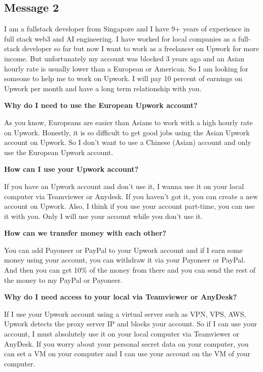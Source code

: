 \documentclass[11pt]{article}
\newcommand{\sender}[2]{%
  \medskip
  \noindent{\small\textbf{From:} #1 \hfill \textbf{Date:} #2}\par
  \smallskip
}
\begin{document}
\newpage
\subsection*{Message 2}

\sender{Kratos}{2026-03-17}

\begin{msgbox}
I am a fullstack developer from Singapore and I have 9+ years of experience in
full stack web3 and AI engineering. I have worked for local companies as a
full-stack developer so far but now I want to work as a freelancer on Upwork
for more income. But unfortunately my account was blocked 3 years ago and an
Asian hourly rate is usually lower than a European or American. So I am looking
for someone to help me to work on Upwork. I will pay 10 percent of earnings on
Upwork per month and have a long term relationship with you.

\smallskip\noindent\textbf{Why do I need to use the European Upwork account?}

As you know, Europeans are easier than Asians to work with a high hourly rate
on Upwork. Honestly, it is so difficult to get good jobs using the Asian Upwork
account on Upwork. So I don't want to use a Chinese (Asian) account and only
use the European Upwork account.

\smallskip\noindent\textbf{How can I use your Upwork account?}

If you have an Upwork account and don't use it, I wanna use it on your local
computer via Teamviewer or Anydesk. If you haven't got it, you can create a new
account on Upwork. Also, I think if you use your account part-time, you can use
it with you. Only I will use your account while you don't use it.

\smallskip\noindent\textbf{How can we transfer money with each other?}

You can add Payoneer or PayPal to your Upwork account and if I earn some money
using your account, you can withdraw it via your Payoneer or PayPal. And then
you can get 10\% of the money from there and you can send the rest of the money
to my PayPal or Payoneer.

\smallskip\noindent\textbf{Why do I need access to your local via Teamviewer or
AnyDesk?}

If I use your Upwork account using a virtual server such as VPN, VPS, AWS,
Upwork detects the proxy server IP and blocks your account. So if I can use
your account, I must absolutely use it on your local computer via Teamviewer or
AnyDesk. If you worry about your personal secret data on your computer, you can
set a VM on your computer and I can use your account on the VM of your computer.


\end{msgbox}
\end{document}
